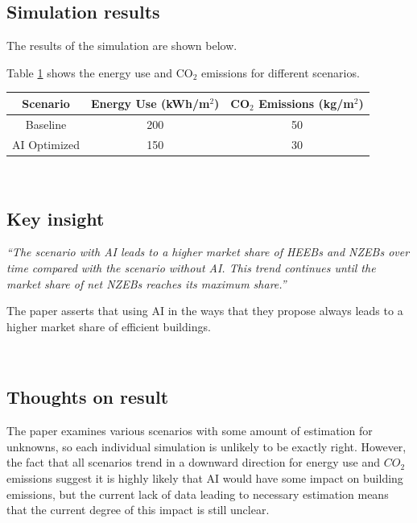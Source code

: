 \documentclass[conference,a4paper]{IEEEtran}
\begin{document}
\subsection*{Simulation results}
The results of the simulation are shown below.

Table \ref{tab:energy-emissions} shows the energy use and CO$_2$ emissions for different scenarios.

\begin{table}
\centering
\begin{tabular}{|c|c|c|}
\hline
\textbf{Scenario} & \textbf{Energy Use (kWh/m$^2$)} & \textbf{CO$_2$ Emissions (kg/m$^2$)} \\
\hline 
Baseline & 200 & 50 \\
\hline
AI Optimized & 150 & 30 \\
\hline
\end{tabular}
\label{tab:energy-emissions}
\end{table}


\\

\subsection*{Key insight}

\textit{“The scenario with AI leads to a higher market share of HEEBs and NZEBs over time compared with the scenario without AI. This trend continues until the market share of net NZEBs reaches its maximum share.”}

The paper asserts that using AI in the ways that they propose always leads to a higher market share of efficient buildings. 

\\

\subsection*{Thoughts on result}
The paper examines various scenarios with some amount of estimation for unknowns, so each individual simulation is unlikely to be exactly right. However, the fact that all scenarios trend in a downward direction for energy use and $CO_2$ emissions suggest it is highly likely that AI would have some impact on building emissions, but the current lack of data leading to necessary estimation means that the current degree of this impact is still unclear.
\end{document}
